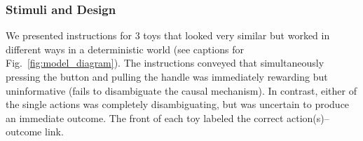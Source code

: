 \documentclass[10pt, letterpaper]{article}
\begin{document}
\hypertarget{stimuli-and-design}{%
\subsubsection{Stimuli and Design}\label{stimuli-and-design}}

We presented instructions for 3 toys that looked very similar but worked
in different ways in a deterministic world (see captions for
Fig.~\ref{fig:model_diagram}). The instructions conveyed that
simultaneously pressing the button and pulling the handle was
immediately rewarding but uninformative (fails to disambiguate the
causal mechanism). In contrast, either of the single actions was
completely disambiguating, but was uncertain to produce an immediate
outcome. The front of each toy labeled the correct action(s)--outcome
link.
\end{document}

